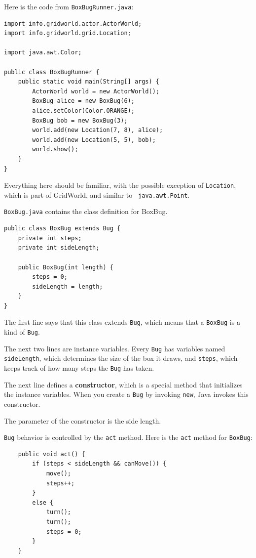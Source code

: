 \documentclass[12pt]{book}
\theoremstyle{exercise}
\begin{document}
Here is the code from {\tt BoxBugRunner.java}:

\begin{lstlisting}
import info.gridworld.actor.ActorWorld;
import info.gridworld.grid.Location;

import java.awt.Color;

public class BoxBugRunner {
    public static void main(String[] args) {
        ActorWorld world = new ActorWorld();
        BoxBug alice = new BoxBug(6);
        alice.setColor(Color.ORANGE);
        BoxBug bob = new BoxBug(3);
        world.add(new Location(7, 8), alice);
        world.add(new Location(5, 5), bob);
        world.show();
    }
}
\end{lstlisting}

Everything here should be familiar, with the possible exception of
{\tt Location}, which is part of GridWorld, and similar to {\tt
  java.awt.Point}.

{\tt BoxBug.java} contains the class definition for BoxBug.

\begin{lstlisting}
public class BoxBug extends Bug {
    private int steps;
    private int sideLength;

    public BoxBug(int length) {
        steps = 0;
        sideLength = length;
    }
}
\end{lstlisting}

The first line says that this class extends {\tt Bug}, which means
that a {\tt BoxBug} is a kind of {\tt Bug}.

The next two lines are instance variables.  Every {\tt Bug}
has variables named {\tt sideLength}, which determines the size of the
box it draws, and {\tt steps}, which keeps track of how many steps
the {\tt Bug} has taken.

The next line defines a {\bf constructor}, which is a special
method that initializes the instance variables.  When you create
a {\tt Bug} by invoking {\tt new}, Java invokes this constructor.

The parameter of the constructor is the side length.

{\tt Bug} behavior is controlled by the {\tt act} method.  Here
is the {\tt act} method for {\tt BoxBug}:

\begin{lstlisting}
    public void act() {
        if (steps < sideLength && canMove()) {
            move();
            steps++;
        }
        else {
            turn();
            turn();
            steps = 0;
        }
    }
\end{lstlisting}
\end{document}
